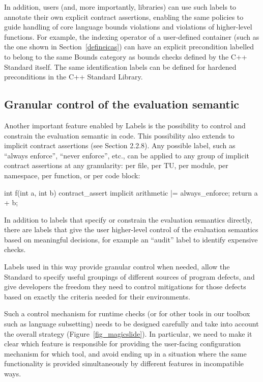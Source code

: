 {In addition, users (and, more importantly, libraries) can use such labels to annotate their own explicit contract assertions, enabling the same policies to guide handling of core language bounds violations and violations of higher-level functions. For example, the indexing operator of a user-defined container (such as the one shown in Section~\ref{defineicas}) can have an explicit precondition labelled to belong to the same Bounds category as bounds checks defined by the C++ Standard itself. The same identification labels can be defined for hardened preconditions in the C++ Standard Library.

\subsection{Granular control of the evaluation semantic}
\label{labels_sema}

Another important feature enabled by Labels is the possibility to control and constrain the evaluation semantic in code. This possibility also extends to implicit contract assertions (see \cite{P3400R1} Section 2.2.8). Any possible label, such as ``always enforce'', ``never enforce'', etc., can be applied to any group of implicit contract assertions at any granularity: per file, per TU, per module, per namespace, per function, or per code block:

\begin{codeblock}
int f(int a, int b) {
  contract_assert implicit arithmetic |= always_enforce;
  return a + b;
}
\end{codeblock}

In addition to labels that specify or constrain the evaluation semantics directly, there are labels that give the user higher-level control of the evaluation semantics based on meaningful decisions, for example an ``audit'' label to identify expensive checks.

Labels used in this way provide granular control when needed, allow the Standard to
specify useful groupings of different sources of program defects, and give developers the freedom they
need to control mitigations for those defects based on exactly the criteria needed for their environments.

Such a control mechanism for runtime checks (or for other tools in our toolbox such as language subsetting) needs to be designed carefully and take into account the overall strategy (Figure~\ref{fig_magicslide}). In particular, we need to make it clear which feature is responsible for providing the user-facing configuration mechanism for which tool, and avoid ending up in a situation where the same functionality is provided simultaneously by different features in incompatible ways.

}
